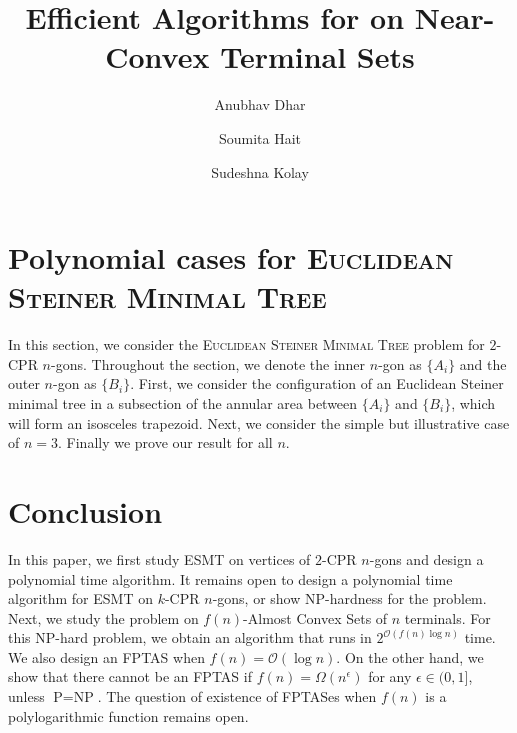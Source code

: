 \documentclass[a4paper,UKenglish,cleveref, autoref, thm-restate]{lipics-v2021}
\title{Efficient Algorithms for \ESMT on Near-Convex Terminal Sets} %
\author{Anubhav Dhar}{Indian Institute of Technology Kharagpur, India}{anubhavdhar@kgpian.iitkgp.ac.in}{}{}%
\author{Soumita Hait}{Indian Institute of Technology Kharagpur, India}{soumitahait7321@gmail.com}{}{}
\author{Sudeshna Kolay}{Indian Institute of Technology Kharagpur, India}{skolay@cse.iitkgp.ac.in}{}{}
\newcommand{\ESMT}{\textsc{Euclidean Steiner Minimal Tree}\xspace}
\newcommand{\pnp}{$\mbox{P} = \mbox{NP}$\xspace}
\newcommand{\OO}{\mathcal{O}}
\begin{document}
\maketitle








% 
% 
% 
\section{Polynomial cases for \ESMT}\label{polycase}
In this section, we consider the \ESMT problem for $2$-CPR $n$-gons. Throughout the section, we denote the inner $n$-gon as $\{A_i\}$ and the outer $n$-gon as $\{B_i\}$. First, we consider the configuration of an Euclidean Steiner minimal tree in a subsection of the annular area between $\{A_i\}$ and $\{B_i\}$, which will form an isosceles trapezoid. Next, we consider the simple but illustrative case of $n = 3$. Finally we prove our result for all $n$.






\section{Conclusion}
 In this paper, we first study ESMT on vertices of $2$-CPR $n$-gons and design a polynomial time algorithm. It remains open to design a polynomial time algorithm for ESMT on $k$-CPR $n$-gons, or show NP-hardness for the problem. Next, we study the problem on $f(n)$-Almost Convex Sets of $n$ terminals. For this NP-hard problem, we obtain an algorithm that runs in $2^{\OO(f(n)\log n)}$ time. We also design an FPTAS when $f(n) = \OO(\log n)$. On the other hand, we show that there cannot be an FPTAS if $f(n) = \Omega(n^{\epsilon})$ for any $\epsilon \in (0,1]$, unless \pnp. The question of existence of FPTASes when $f(n)$ is a polylogarithmic function remains open.

%

\end{document}
